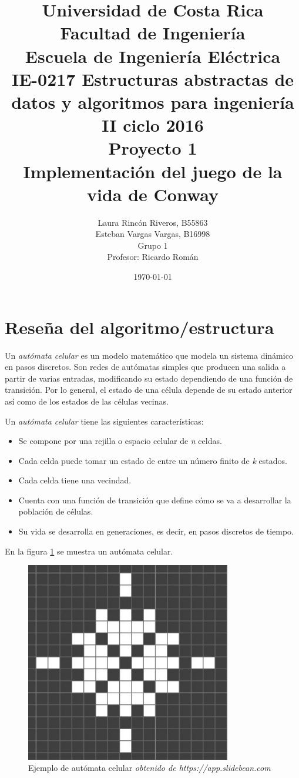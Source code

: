 \documentclass[12pt,letterpaper]{article}
\author{Laura Rincón Riveros, B55863\\ Esteban Vargas Vargas, B16998 \\ {\small Grupo 1}\\ Profesor: Ricardo Román \vspace*{1.0in}}
\title{Universidad de Costa Rica\\{\small Facultad de Ingeniería\\Escuela de Ingeniería Eléctrica\\IE-0217 Estructuras abstractas de datos y algoritmos para ingeniería\\II ciclo 2016\\\vspace*{1.5in}} Proyecto 1 \\ Implementación del juego de la vida de Conway  \vspace*{0.7in}}
\date{\today \vspace*{1.0in}}
\begin{document}


\maketitle							%


\newpage
\tableofcontents
\newpage
\listoffigures

\listoftables

\newpage
\section{Reseña del algoritmo/estructura}
Un \textit{autómata celular} es un modelo matemático que modela un sistema dinámico en pasos discretos. Son redes de autómatas simples que producen una salida a partir de varias entradas, modificando su estado dependiendo de una función de transición. Por lo general, el estado de una célula depende de su estado anterior así como de los estados de las células vecinas. 

Un \textit{autómata celular} tiene las siguientes características:
\begin{itemize}
\item Se compone por una rejilla o espacio celular de \textit{n} celdas.
\item Cada celda puede tomar un estado de entre un número finito de \textit{k} estados.
\item Cada celda tiene una vecindad.
\item Cuenta con una función de transición que define cómo se va a desarrollar la población de células.
\item Su vida se desarrolla en generaciones, es decir, en pasos discretos de tiempo. 
\end{itemize}
En la figura \ref{fig:AM} se muestra un autómata celular.
\begin{figure}[H]
\centering
\includegraphics[width=0.8\textwidth]{img/automataCelular}
\caption{\label{fig:AM} Ejemplo de autómata celular \textit{obtenido de https://app.slidebean.com}}
\end{figure}
\end{document}
